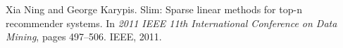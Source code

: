 
\begin{DoxyDescription}
\item[\label{_CITEREF_ning2011slim}%
\mbox{[}1\mbox{]}]Xia Ning and George Karypis. Slim\+: Sparse linear methods for top-\/n recommender systems. In {\itshape 2011 I\+E\+EE 11th International Conference on Data Mining}, pages 497--506. I\+E\+EE, 2011.


\end{DoxyDescription}